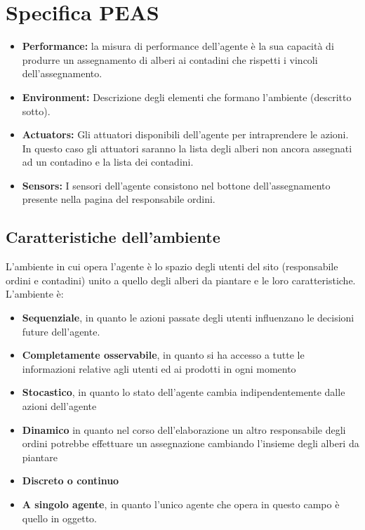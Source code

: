 \section{Specifica PEAS} %
\begin{itemize}
\item \textbf{Performance:} la misura di performance dell'agente è la sua capacità di produrre un assegnamento di alberi ai contadini che rispetti i vincoli dell'assegnamento. 
\item \textbf{Environment:} Descrizione degli elementi che formano l’ambiente (descritto sotto).
\item \textbf{Actuators:} Gli attuatori disponibili dell’agente per intraprendere le azioni. In questo caso gli attuatori saranno la lista degli alberi non ancora assegnati ad un contadino e la lista dei contadini. 
\item \textbf{Sensors:} I sensori dell'agente consistono nel bottone dell'assegnamento presente nella pagina del responsabile ordini.
\end{itemize}

\subsection{Caratteristiche dell'ambiente} 
L'ambiente in cui opera l'agente è lo spazio degli utenti del sito (responsabile ordini e contadini) unito a quello degli alberi da piantare e le loro caratteristiche. 
L'ambiente è: 
\begin{itemize}
\item \textbf{Sequenziale}, in quanto le azioni passate degli utenti influenzano le decisioni future dell'agente. 
\item \textbf{Completamente osservabile}, in quanto si ha accesso a tutte le informazioni relative agli utenti ed ai prodotti in ogni momento
\item \textbf {Stocastico}, in quanto lo stato dell'agente cambia indipendentemente dalle azioni dell'agente
\item \textbf {Dinamico} in quanto nel corso dell'elaborazione un altro responsabile degli ordini potrebbe effettuare un assegnazione cambiando l'insieme degli alberi da piantare
\item \textbf{Discreto o continuo}
\item \textbf {A singolo agente}, in quanto l'unico agente che opera in questo campo è quello in oggetto.
\end{itemize}


